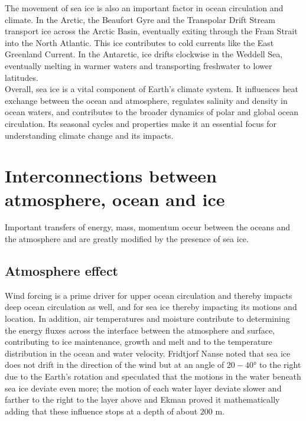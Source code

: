 The movement of sea ice is also an important factor in ocean circulation and climate. In the Arctic, the Beaufort Gyre and the Transpolar Drift Stream transport ice across the Arctic Basin, eventually exiting through the Fram Strait into the North Atlantic. This ice contributes to cold currents like the East Greenland Current. In the Antarctic, ice drifts clockwise in the Weddell Sea, eventually melting in warmer waters and transporting freshwater to lower latitudes. \\
[0.15 cm]

Overall, sea ice is a vital component of Earth's climate system. It influences heat exchange between the ocean and atmosphere, regulates salinity and density in ocean waters, and contributes to the broader dynamics of polar and global ocean circulation. Its seasonal cycles and properties make it an essential focus for understanding climate change and its impacts.

\section{Interconnections between atmosphere, ocean and ice}
Important transfers of energy, mass, momentum occur between the oceans and the atmosphere and are greatly modified by the presence of sea ice.
\subsection{Atmosphere effect}
Wind forcing is a prime driver for upper ocean circulation and thereby impacts deep ocean circulation as well, and for sea ice thereby impacting its motions and location. In addition, air temperatures and moisture contribute to determining the energy fluxes across the interface between the atmosphere and surface, contributing to ice maintenance, growth and melt and to the temperature distribution in the ocean and water velocity. 
Fridtjorf Nanse noted that sea ice does not drift in the direction of the wind but at an angle of $20-40°$ to the right due to the Earth’s rotation and speculated that the motions in the water beneath sea ice deviate even more; the motion of each water layer deviate slower and farther to the right to the layer above and Ekman proved it mathematically adding that these influence stops at a depth of about $200$ m.

